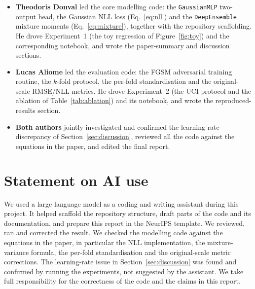 \documentclass{article}
\begin{document}
\begin{itemize}
  \item \textbf{Theodoris Donval} led the core modelling code: the
  \texttt{GaussianMLP} two-output head, the Gaussian NLL loss
  (Eq.~\eqref{eq:nll}) and the \texttt{DeepEnsemble} mixture moments
  (Eq.~\eqref{eq:mixture}), together with the repository scaffolding. He drove
  Experiment~1 (the toy regression of Figure~\ref{fig:toy}) and the
  corresponding notebook, and wrote the paper-summary and discussion sections.
  \item \textbf{Lucas Aliome} led the evaluation code: the FGSM adversarial
  training routine, the $k$-fold protocol, the per-fold standardisation and the
  original-scale RMSE/NLL metrics. He drove Experiment~2 (the UCI protocol and
  the ablation of Table~\ref{tab:ablation}) and its notebook, and wrote the
  reproduced-results section.
  \item \textbf{Both authors} jointly investigated and confirmed the
  learning-rate discrepancy of Section~\ref{sec:discussion}, reviewed all the
  code against the equations in the paper, and edited the final report.
\end{itemize}

\section*{Statement on AI use}
We used a large language model as a coding and writing assistant during this
project. It helped scaffold the repository structure, draft parts of the code
and its documentation, and prepare this report in the NeurIPS template. We
reviewed, ran and corrected the result. We checked the modelling code against the
equations in the paper, in particular the NLL implementation, the
mixture-variance formula, the per-fold standardisation and the original-scale
metric corrections. The learning-rate issue in Section~\ref{sec:discussion} was
found and confirmed by running the experiments, not suggested by the assistant.
We take full responsibility for the correctness of the code and the claims in
this report.
\end{document}
